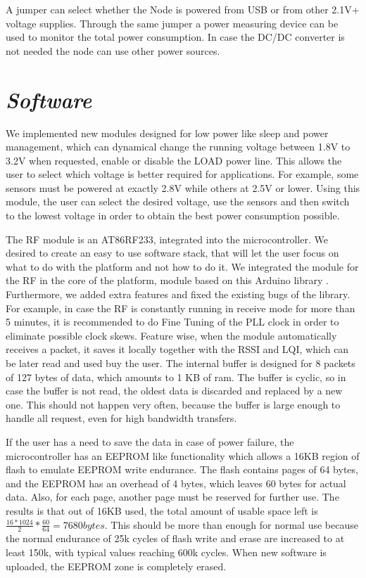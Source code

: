 A jumper can select whether the Node is powered from USB or from other 2.1V+ voltage supplies. Through
the same jumper a power measuring device can be used to monitor the total power consumption. In case the DC/DC converter is not
needed the node can use other power sources.

\section{\textit{Software}}

We implemented new modules designed for low power like sleep and power management, which can dynamical
change the running voltage between 1.8V to 3.2V when requested, enable or disable the LOAD power
line. This allows the user to select which voltage is better required for applications. For example,
some sensors must be powered at exactly 2.8V while others at 2.5V or lower. Using this module, the
user can select the desired voltage, use the sensors and then switch to the lowest
voltage in order to obtain the best power consumption possible.

The RF module is an AT86RF233, integrated into the microcontroller. We desired to create an easy to
use software stack, that will let the user focus on what to do with the platform and not how to do
it. We integrated the module for the RF in the core of the platform, module based on this Arduino
library \cite{rf233}. Furthermore, we added extra features and fixed the existing bugs of the
library. For example, in case the RF is constantly running in receive mode for
more than 5 minutes, it is recommended to do Fine Tuning of the PLL clock in order to eliminate
possible clock skews. Feature wise, when the module automatically receives a packet, it saves it
locally together with the RSSI and LQI, which can be later read and used buy the user. The internal
buffer is designed for 8 packets of 127 bytes of data, which amounts to 1 KB of ram. The buffer is
cyclic, so in case the buffer is not read, the oldest data is discarded and replaced by a new one.
This should not happen very often, because the buffer is large enough to handle all request, even
for high bandwidth transfers.

If the user has a need to save the data in case of power failure, the microcontroller has an
EEPROM like functionality which allows a 16KB region of flash to emulate EEPROM write endurance.
The flash contains pages of 64 bytes, and the EEPROM has an overhead of 4 bytes, which leaves 60
bytes for actual data. Also, for each page, another page must be reserved for further use.
The results is that out of 16KB used, the total amount of usable space left is $\frac{16*1024}{2}
* \frac{60}{64} = 7680 bytes$. This should be more than enough for normal use because the normal
endurance of 25k cycles of flash write and erase are increased to at least 150k, with typical
values reaching 600k cycles. When new software is uploaded, the EEPROM zone is completely erased.


